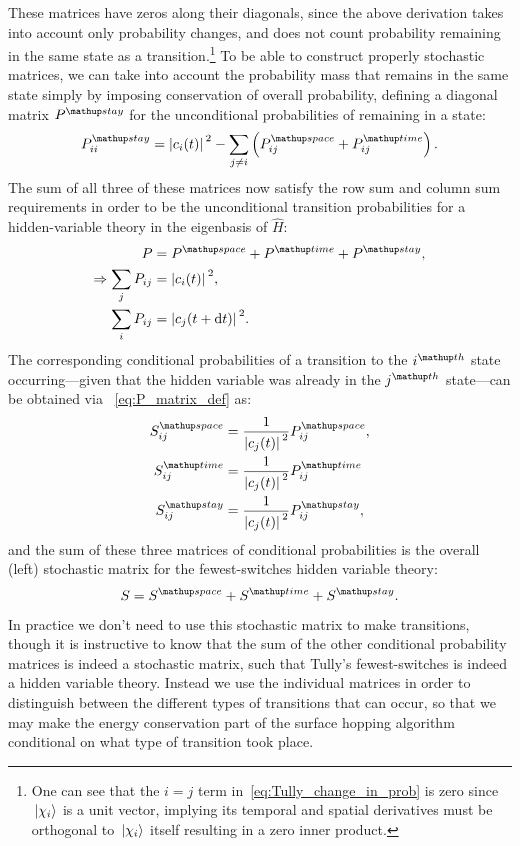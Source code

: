 These matrices have zeros along their diagonals, since the above derivation takes into account only probability changes, and does not count probability remaining in the same state as a transition.\footnote{One can see that the $i=j$ term in~\eqref{eq:Tully_change_in_prob} is zero since $\ket{\chi_i}$ is a unit vector, implying its temporal and spatial derivatives must be orthogonal to $\ket{\chi_i}$ itself resulting in a zero inner product.} To be able to construct properly stochastic matrices, we can take into account the probability mass that remains in the same state simply by imposing conservation of overall probability, defining a diagonal matrix $P^\up{stay}$ for the unconditional probabilities of remaining in a state:
\begin{align}
P^\up{stay}_{ii} = \abs{c_i(t)}^2
- \sum_{j\neq i} \left(P^\up{space}_{ij} + P^\up{time}_{ij}\right).
\end{align}
The sum of all three of these matrices now satisfy the row sum and column sum requirements in order to be the unconditional transition probabilities for a hidden-variable theory in the eigenbasis of $\hat H$:
\begin{align}
P &= P^\up{space} + P^\up{time} + P^\up{stay},\\
\Rightarrow \sum_j P_{ij} &= \abs{c_i(t)}^2,\\
\sum_i P_{ij} &= \abs{c_j(t + \dd t)}^2.
\end{align}
The corresponding conditional probabilities of a transition to the $i^\up{th}$ state occurring---given that the hidden variable was already in the $j^\up{th}$ state---can be obtained via ~\eqref{eq:P_matrix_def} as:
\begin{align}
S^\up{space}_{ij} &= \frac1{\abs{c_j(t)}^2} P^\up{space}_{ij},\\
S^\up{time}_{ij} &= \frac1{\abs{c_j(t)}^2} P^\up{time}_{ij}\\
S^\up{stay}_{ij} &= \frac1{\abs{c_j(t)}^2} P^\up{stay}_{ij},
\end{align}
and the sum of these three matrices of conditional probabilities is the overall (left) stochastic matrix for the fewest-switches hidden variable theory:
\begin{align}
S = S^\up{space} + S^\up{time} + S^\up{stay}.
\end{align}
In practice we don't need to use this stochastic matrix to make transitions, though it is instructive to know that the sum of the other conditional probability matrices is indeed a stochastic matrix, such that Tully's fewest-switches is indeed a hidden variable theory.
Instead we use the individual matrices in order to distinguish between the different types of transitions that can occur, so that we may make the energy conservation part of the surface hopping algorithm conditional on what type of transition took place.

